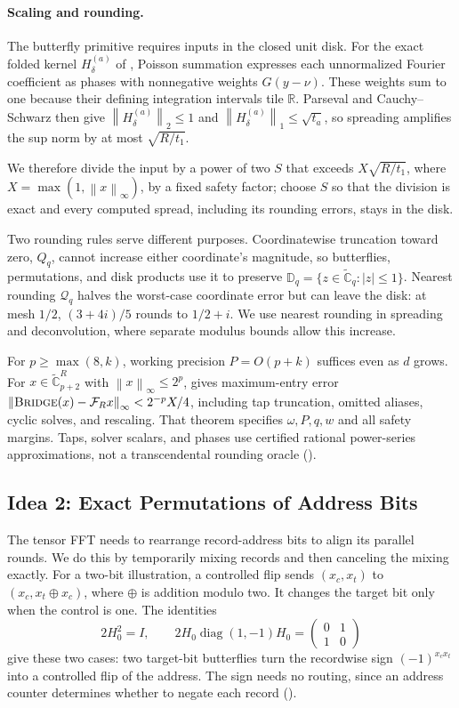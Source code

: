 \documentclass[11pt]{article}
\theoremstyle{definition}
\newcommand{\R}{\mathbb{R}}
\newcommand{\Cg}{\widetilde{\mathbb{C}}}
\newcommand{\Disk}{\mathbb{D}}
\newcommand{\cF}{\mathcal{F}}
\newcommand{\Quant}{\mathcal{Q}}
\newcommand{\diag}{\operatorname{diag}}
\newcommand{\norm}[1]{\left\lVert #1 \right\rVert}
\newcommand{\Bridge}{\textnormal{\textsc{Bridge}}}
\begin{document}
\paragraph{Scaling and rounding.}
The butterfly primitive requires inputs in the closed unit disk.
For the exact folded kernel $H_\delta^{(a)}$ of , Poisson summation expresses each unnormalized Fourier coefficient as phases with nonnegative weights $G(y-\nu)$.
These weights sum to one because their defining integration intervals tile $\R$.
Parseval and Cauchy--Schwarz then give
$\norm{H_\delta^{(a)}}_2\le1$ and
$\norm{H_\delta^{(a)}}_1\le\sqrt{t_a}$, so spreading amplifies the sup norm by at most $\sqrt{R/t_1}$.

We therefore divide the input by a power of two $S$ that exceeds $X\sqrt{R/t_1}$, where $X=\max(1,\norm{x}_\infty)$, by a fixed safety factor;  choose $S$ so that the division is exact and every computed spread, including its rounding errors, stays in the disk.

Two rounding rules serve different purposes.
Coordinatewise truncation toward zero, $Q_q$, cannot increase either coordinate's magnitude, so butterflies, permutations, and disk products use it to preserve $\Disk_q=\{z\in\Cg_q:|z|\le1\}$.
Nearest rounding $\Quant_q$ halves the worst-case coordinate error but can leave the disk: at mesh $1/2$, $(3+4i)/5$ rounds to $1/2+i$.
We use nearest rounding in spreading and deconvolution, where separate modulus bounds allow this increase.

For $p\ge\max(8,k)$, working precision $P=O(p+k)$ suffices even as $d$ grows.
For $x\in\Cg_{p+2}^R$ with $\norm{x}_\infty\le2^p$,  gives maximum-entry error
$\norm{\Bridge(x)-\cF_Rx}_\infty<2^{-p}X/4$, including tap truncation, omitted aliases, cyclic solves, and rescaling.
That theorem specifies $\omega,P,q,w$ and all safety margins.
Taps, solver scalars, and phases use certified rational power-series approximations, not a transcendental rounding oracle ().

\subsection{Idea 2: Exact Permutations of Address Bits}

The tensor FFT needs to rearrange record-address bits to align its parallel rounds.
We do this by temporarily mixing records and then canceling the mixing exactly.
For a two-bit illustration, a controlled flip sends
$(x_c,x_t)$ to $(x_c,x_t\oplus x_c)$, where $\oplus$ is addition modulo two.
It changes the target bit only when the control is one.
The identities
\[
 2H_0^2=I,\qquad
 2H_0\diag(1,-1)H_0=
 \begin{pmatrix}0&1\\1&0\end{pmatrix}
\]
give these two cases: two target-bit butterflies turn the recordwise sign $(-1)^{x_cx_t}$ into a controlled flip of the address.
The sign needs no routing, since an address counter determines whether to negate each record ().
\end{document}

